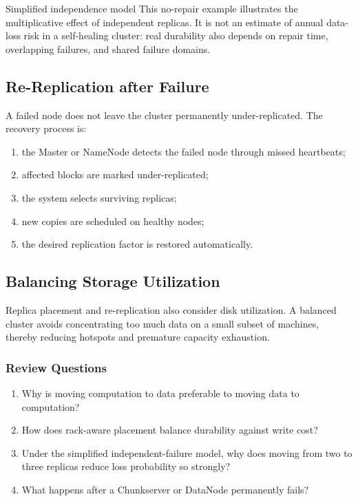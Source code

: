 \documentclass[11pt,a4paper,oneside]{book}
\begin{document}
\begin{remarkbox}{Simplified independence model}
This no-repair example illustrates the multiplicative effect of independent replicas. It is not an estimate of annual data-loss risk in a self-healing cluster: real durability also depends on repair time, overlapping failures, and shared failure domains.
\end{remarkbox}

\subsection{Re-Replication after Failure}

A failed node does not leave the cluster permanently under-replicated. The recovery process is:

\begin{enumerate}
    \item the Master or NameNode detects the failed node through missed heartbeats;
    \item affected blocks are marked under-replicated;
    \item the system selects surviving replicas;
    \item new copies are scheduled on healthy nodes;
    \item the desired replication factor is restored automatically.
\end{enumerate}

\subsection{Balancing Storage Utilization}

Replica placement and re-replication also consider disk utilization. A balanced cluster avoids concentrating too much data on a small subset of machines, thereby reducing hotspots and premature capacity exhaustion.

\subsubsection*{Review Questions}
\begin{enumerate}
    \item Why is moving computation to data preferable to moving data to computation?
    \item How does rack-aware placement balance durability against write cost?
    \item Under the simplified independent-failure model, why does moving from two to three replicas reduce loss probability so strongly?
    \item What happens after a Chunkserver or DataNode permanently fails?
\end{enumerate}
\end{document}
